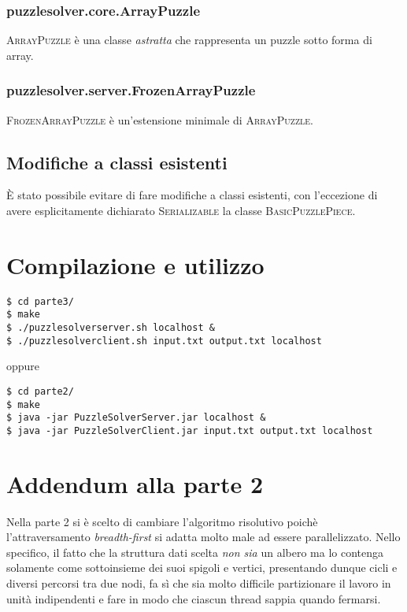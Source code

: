 \documentclass[a4paper]{article}
\newcommand{\Classname}[1]{\textsc{#1}}
\newcommand{\Ifacename}[1]{\textsc{#1}}
\begin{document}
\subsubsection{puzzlesolver.core.ArrayPuzzle}
\Classname{ArrayPuzzle} \`e una classe \emph{astratta} che rappresenta un puzzle sotto forma di array.
\subsubsection{puzzlesolver.server.FrozenArrayPuzzle}
\Classname{FrozenArrayPuzzle} \`e un'estensione minimale di \Classname{ArrayPuzzle}.

\subsection{Modifiche a classi esistenti}
\`E stato possibile evitare di fare modifiche a classi esistenti, con l'eccezione di avere esplicitamente dichiarato \Ifacename{Serializable} la classe \Classname{BasicPuzzlePiece}.

\section{Compilazione e utilizzo}
\begin{verbatim}
$ cd parte3/ 
$ make
$ ./puzzlesolverserver.sh localhost &
$ ./puzzlesolverclient.sh input.txt output.txt localhost
\end{verbatim}
oppure
\begin{verbatim}
$ cd parte2/ 
$ make
$ java -jar PuzzleSolverServer.jar localhost &
$ java -jar PuzzleSolverClient.jar input.txt output.txt localhost
\end{verbatim}

% 
\appendix
\section{Addendum alla parte 2}
Nella parte 2 si \`e scelto di cambiare l'algoritmo risolutivo poich\`e l'attraversamento \emph{breadth-first} si adatta molto male ad essere parallelizzato.
Nello specifico, il fatto che la struttura dati scelta \emph{non sia} un albero ma lo contenga solamente come sottoinsieme dei suoi spigoli e vertici, presentando dunque cicli e diversi percorsi tra due nodi, fa s\`i che sia molto difficile partizionare il lavoro in unit\`a indipendenti e fare in modo che ciascun thread sappia quando fermarsi.
\end{document}
